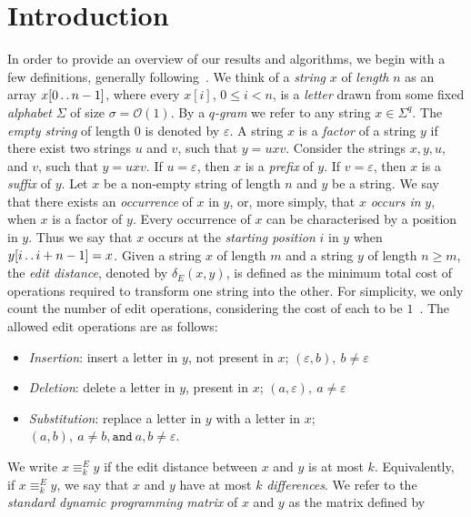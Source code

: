 \documentclass[runningheads, envcountsame, a4paper]{llncs}\usepackage{etex}
\def\dd{\mathinner{.\,.}}
\newcommand{\cO}{\mathcal{O}}
\begin{document}
\section{Introduction}
In order to provide an overview of our results and algorithms,
we begin with a few definitions, generally following~\cite{CHL07}.
We think of a \textit{string} $x$ of \textit{length} $n$ as an array
$x[0\dd n-1]$, where every $x[i]$, $0 \le i < n$, is a \textit{letter}
drawn from some fixed \textit{alphabet} $\Sigma$ of size $\sigma = \cO(1)$.
By a {\em $q$-gram} we refer to any string $x \in \Sigma^q$.
The \textit{empty string} of length $0$ is denoted by $\varepsilon$.
A string $x$ is a \textit{factor} of a string $y$ if there exist two strings $u$ and $v$, such that $y=uxv$.
Consider the strings $x,y,u$, and $v$, such that $y=uxv$. If $u=\varepsilon$, 
then $x$ is a \textit{prefix} of $y$. If $v=\varepsilon$, then $x$ is a \textit{suffix} of $y$.
Let $x$ be a non-empty string of length $n$ and $y$ be a string. 
We say that there exists an \textit{occurrence} of $x$ in $y$, or, more simply, that $x$
\textit{occurs in} $y$, when $x$ is a factor of $y$.
Every occurrence of $x$ can be characterised by a position in $y$. Thus we say that $x$ occurs at the
\textit{starting position} $i$ in $y$ when $y[i \dd i + n - 1]=x$.
Given a string $x$ of length $m$ and a string $y$ of length $n \geq m$, the \emph{edit distance}, 
denoted by $\delta_E(x,y)$, is defined as the minimum total cost of operations 
required to transform one string into the other. For simplicity, we only count the number of edit operations, 
considering the cost of each to be $1$~\cite{levelshtein-66-binary}.
The allowed edit operations are as follows:
\begin{itemize}
	\item \emph{Insertion}: insert a letter in $y$, not present in $x$; $(\varepsilon, b),~b \neq \varepsilon$
	\item \emph{Deletion}: delete a letter in $y$, present in $x$; $(a, \varepsilon),~a \neq \varepsilon$ 
	\item \emph{Substitution}: replace a letter in $y$ with a letter in $x$; $(a,b),~a \neq b,\texttt{and}~a,b \neq \varepsilon$. 
\end{itemize}

\noindent We write $x \equiv_k^E y$ if the edit distance between $x$
and $y$ is at most $k$. Equivalently, if $x \equiv_k^E y$, we say that
$x$ and $y$ have at most $k$ {\em differences}. 
We refer to the \textit{standard dynamic programming matrix} of $x$ and $y$ as the matrix defined by
\end{document}

